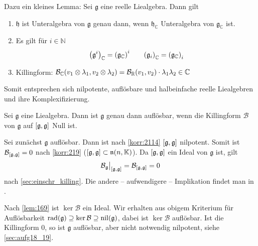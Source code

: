 Dazu ein kleines Lemma: Sei $\mathfrak{g}$ eine reelle Liealgebra.
Dann gilt
\begin{enumerate}[1)]
	\item $\mathfrak{h}$ ist Unteralgebra von $\mathfrak{g}$ genau dann, wenn $\mathfrak{h}_\mathbb{C}$ Unteralgebra von $\mathfrak{g}_\mathbb{C}$ ist.
	\item Es gilt für $i \in \mathbb{N}$
	\[
		\enbrace*{\mathfrak{g}^i}_\mathbb{C} = \enbrace*{\mathfrak{g}_\mathbb{C}}^i \qquad \enbrace*{\mathfrak{g}_i}_\mathbb{C} = \enbrace*{\mathfrak{g}_\mathbb{C}}_i
	\]
	\item Killingform: $\mathcal{B}_\mathbb{C} \enbrace*{v_1 \otimes \lambda_1, v_2 \otimes \lambda_2} = \mathcal{B}_\mathbb{R}(v_1,v_2) \cdot \lambda_1 \lambda_2 \in \mathbb{C}$
\end{enumerate}
Somit entsprechen sich nilpotente, auflösbare und halbeinfache reelle Liealgebren und ihre Komplexifizierung.

\begin{satz}[name={Cartan},label=satz:2115]
	Sei $\mathfrak{g}$ eine Liealgebra.
	Dann ist $\mathfrak{g}$ genau dann auflösbar, wenn die Killingform $\mathcal{B}$ von $\mathfrak{g}$ auf $\benbrace*{\mathfrak{g},\mathfrak{g}}$ Null ist.
\end{satz}
\begin{beweis}
	Sei zunächst $\mathfrak{g}$ auflösbar.
	Dann ist nach \autoref{korr:2114} $\benbrace*{\mathfrak{g},\mathfrak{g}}$ nilpotent.
	Somit ist $\mathcal{B}_{\benbrace{\mathfrak{g},\mathfrak{g}}}=0$ nach \autoref{korr:219} ($\benbrace*{\mathfrak{g},\mathfrak{g}} \subset \mathfrak{n}(n,\mathbb{\mathbb{K}})$).
	Da $\benbrace*{\mathfrak{g},\mathfrak{g}}$ ein Ideal von $\mathfrak{g}$ ist, gilt 
	\[
		\mathcal{B}_{\mathfrak{g}}\big|_{\benbrace*{\mathfrak{g},\mathfrak{g}}} = \mathcal{B}_{\benbrace*{\mathfrak{g},\mathfrak{g}}} =0
	\]
	nach \cref{sec:einschr_killing}.
	Die andere -- aufwendigere -- Implikation findet man in \cite[Sec.~4.6.4]{procesiLie}.
\end{beweis}

Nach \autoref{lem:169} ist $\ker \mathcal{B}$ ein Ideal.
Wir erhalten aus obigem Kriterium für Auflösbarkeit $\rad(\mathfrak{g}) \supseteq \ker \mathcal{B} \supseteq \nil(\mathfrak{g})$, dabei ist $\ker \mathcal{B}$ auflösbar.
Ist die Killingform $0$, so ist $\mathfrak{g}$ auflösbar, aber nicht notwendig nilpotent, siehe \cref{sec:aufg18_19}.

